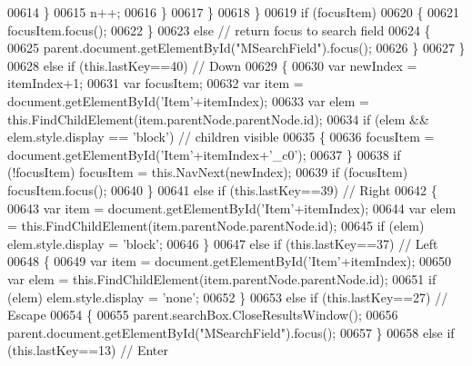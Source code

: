 \begin{DoxyCode}
00614               \}
00615               n++;
00616             \}
00617           \}
00618         \}
00619         \textcolor{keywordflow}{if} (focusItem)
00620         \{
00621           focusItem.focus();
00622         \}
00623         \textcolor{keywordflow}{else} \textcolor{comment}{// return focus to search field}
00624         \{
00625            parent.document.getElementById(\textcolor{stringliteral}{"MSearchField"}).focus();
00626         \}
00627       \}
00628       \textcolor{keywordflow}{else} \textcolor{keywordflow}{if} (this.lastKey==40) \textcolor{comment}{// Down}
00629       \{
00630         var newIndex = itemIndex+1;
00631         var focusItem;
00632         var item = document.getElementById(\textcolor{stringliteral}{'Item'}+itemIndex);
00633         var elem = this.FindChildElement(item.parentNode.parentNode.id);
00634         \textcolor{keywordflow}{if} (elem && elem.style.display == \textcolor{stringliteral}{'block'}) \textcolor{comment}{// children visible}
00635         \{
00636           focusItem = document.getElementById(\textcolor{stringliteral}{'Item'}+itemIndex+\textcolor{stringliteral}{'\_c0'});
00637         \}
00638         \textcolor{keywordflow}{if} (!focusItem) focusItem = this.NavNext(newIndex);
00639         \textcolor{keywordflow}{if} (focusItem)  focusItem.focus();
00640       \}
00641       \textcolor{keywordflow}{else} \textcolor{keywordflow}{if} (this.lastKey==39) \textcolor{comment}{// Right}
00642       \{
00643         var item = document.getElementById(\textcolor{stringliteral}{'Item'}+itemIndex);
00644         var elem = this.FindChildElement(item.parentNode.parentNode.id);
00645         \textcolor{keywordflow}{if} (elem) elem.style.display = \textcolor{stringliteral}{'block'};
00646       \}
00647       \textcolor{keywordflow}{else} \textcolor{keywordflow}{if} (this.lastKey==37) \textcolor{comment}{// Left}
00648       \{
00649         var item = document.getElementById(\textcolor{stringliteral}{'Item'}+itemIndex);
00650         var elem = this.FindChildElement(item.parentNode.parentNode.id);
00651         \textcolor{keywordflow}{if} (elem) elem.style.display = \textcolor{stringliteral}{'none'};
00652       \}
00653       \textcolor{keywordflow}{else} \textcolor{keywordflow}{if} (this.lastKey==27) \textcolor{comment}{// Escape}
00654       \{
00655         parent.searchBox.CloseResultsWindow();
00656         parent.document.getElementById(\textcolor{stringliteral}{"MSearchField"}).focus();
00657       \}
00658       \textcolor{keywordflow}{else} \textcolor{keywordflow}{if} (this.lastKey==13) \textcolor{comment}{// Enter}

\end{DoxyCode}
